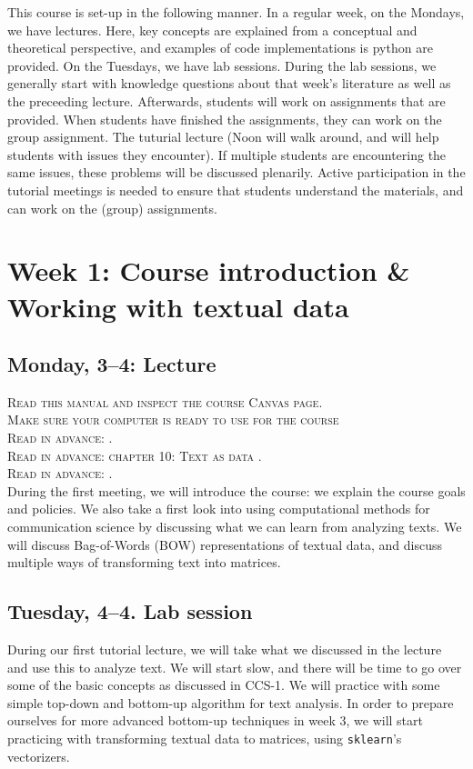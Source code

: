 This course is set-up in the following manner. In a regular week, on the Mondays, we have lectures. Here, key concepts are explained from a conceptual and theoretical perspective, and examples of code implementations is python are provided.  On the Tuesdays, we have lab sessions. During the lab sessions, we generally start with knowledge questions about that week's literature as well as the preceeding lecture. Afterwards, students will work on assignments that are provided. When students have finished the assignments, they can work on the group assignment. The tuturial lecture (Noon will walk around, and will help students with issues they encounter). If multiple students are encountering the same issues, these problems will be discussed plenarily. Active participation in the tutorial meetings is needed to ensure that students understand the materials, and can work on the (group) assignments.

\section*{Week 1: Course introduction \& Working with textual data}

\subsection*{Monday, 3--4: Lecture}
\textsc{ Read this manual and inspect the course Canvas page.}\\
\textsc{ Make sure your computer is ready to use for the course }\\
\textsc{ Read in advance: \cite{Hirschenberg2015}.} \\
\textsc{Read in advance: chapter 10: Text as data \cite{van_atteveldt_computational_2022}.} \\
\textsc{Read in advance: \cite{Boumans2016}.} \\
During the first meeting, we will introduce the course: we explain the course goals and policies. We also take a first look into using computational methods for communication science by discussing what we can learn from analyzing texts.
We will discuss Bag-of-Words (BOW) representations of textual data, and discuss multiple ways of transforming text into matrices. 

\subsection*{Tuesday, 4--4. Lab session}
During our first tutorial lecture, we will take what we discussed in the lecture and use this to analyze text. We will start slow, and there will be time to go over some of the basic concepts as discussed in CCS-1.
We will practice with some simple top-down and bottom-up algorithm for text analysis. In order to prepare ourselves for more advanced bottom-up techniques in week 3, we will start practicing with transforming textual data to matrices, using  \texttt{sklearn}'s vectorizers. 

